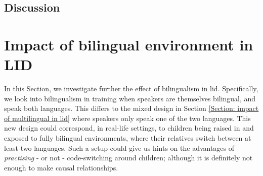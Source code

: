 \bigskip
\par \noindent {}


\subsection{Discussion}




\section{Impact of bilingual environment in LID}\label{Section: Impact bilingual env}

In this Section, we investigate further the effect of bilingualism in \acrshort{lid}. Specifically, we look into bilingualism in training when speakers are themselves bilingual, and speak both languages. This differs to the mixed design in Section \ref{Section: impact of multilingual in lid} where speakers only speak one of the two languages. This new design could correspond, in real-life settings, to children being raised in and exposed to fully bilingual environments, where their relatives switch between at least two languages. Such a setup could give us hints on the advantages of \textit{practising} - or not - code-switching around children; although it is definitely not enough to make causal relationships. 



